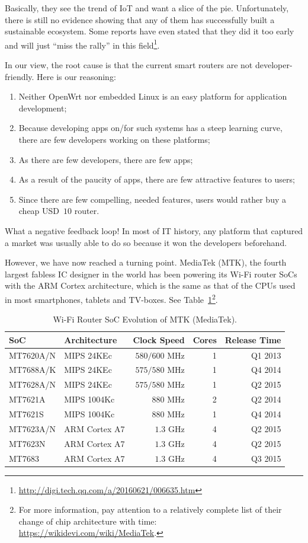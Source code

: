 Basically, they see the trend of IoT and want a slice of the pie. Unfortunately, there is still no evidence showing that any of them has successfully built a sustainable ecosystem. Some reports have even stated that they did it too early and will just ``miss the rally'' in this field\footnote{\url{http://digi.tech.qq.com/a/20160621/006635.htm}}. 

In our view, the root cause is that the current smart routers are not developer-friendly. Here is our reasoning:
\begin{enumerate}
	\item Neither OpenWrt nor embedded Linux is an easy platform for application development; 
	\item Because developing apps on/for such systems has a steep learning curve, there are few developers working on these platforms; 
	\item As there are few developers, there are few apps;
	\item As a result of the paucity of apps, there are few attractive features to users; 
	\item Since there are few compelling, needed features, users would rather buy a cheap USD~$10$ router.
\end{enumerate}

What a negative feedback loop! In most of IT history, any platform that captured a market was usually able to do so because it won the developers beforehand. 

However, we have now reached a turning point. MediaTek (MTK), the fourth largest fabless IC designer in the world has been powering its Wi-Fi router SoCs with the ARM Cortex architecture, which is the same as that of the CPUs used in most smartphones, tablets and TV-boxes. See Table~\ref{tb:mtk-soc}\footnote{For more information, pay attention to a relatively complete list of their change of chip architecture with time: \url{https://wikidevi.com/wiki/MediaTek}.}.
\begin{table}[htbp]
	\centering
	\caption{Wi-Fi Router SoC Evolution of MTK (MediaTek).}\label{tb:mtk-soc}
	\begin{tabular}[t]{llrrr}  
		\toprule
		SoC & Architecture  & Clock Speed & Cores & Release Time\\
		\midrule
		MT7620A/N	& MIPS 24KEc & $580/600$ MHz & 1 & Q1 2013\\
		MT7688A/K	& MIPS 24KEc & $575/580$ MHz & 1 & Q4 2014\\
		MT7628A/N	& MIPS 24KEc & $575/580$ MHz & 1 & Q2 2015\\
		MT7621A     & MIPS 1004Kc & $880$ MHz    & 2 & Q2 2014\\
		MT7621S     & MIPS 1004Kc & $880$ MHz    & 1 & Q4 2014\\
		MT7623A/N   & ARM Cortex A7	& $1.3$ GHz	 & 4 & Q2 2015\\
		MT7623N	    & ARM Cortex A7	& $1.3$ GHz	 & 4 & Q2 2015\\
		MT7683	    & ARM Cortex A7	& $1.3$ GHz	 & 4 & Q3 2015\\
		\bottomrule
	\end{tabular}
\end{table}

